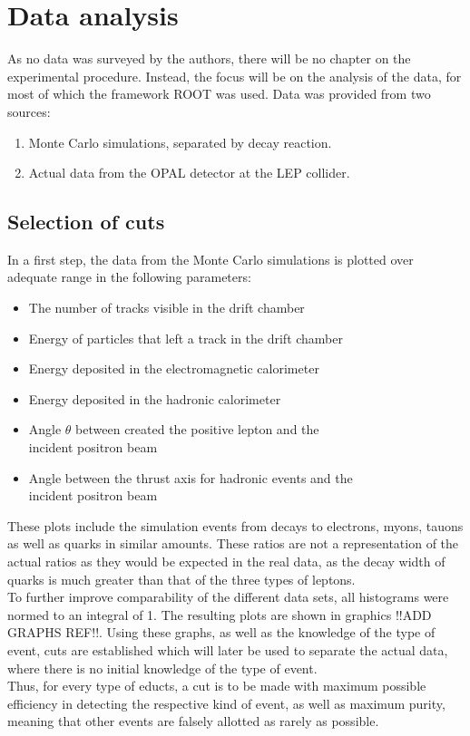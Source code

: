 \section{Data analysis}
As no data was surveyed by the authors, there will be no chapter on the experimental procedure. Instead, the focus will be on the analysis of the data, for most of which the framework ROOT was used. Data was provided from two sources:
\begin{enumerate}
	\item Monte Carlo simulations, separated by decay reaction.
	\item Actual data from the OPAL detector at the LEP collider.
\end{enumerate}


\subsection{Selection of cuts}
In a first step, the data from the Monte Carlo simulations is plotted over adequate range in the following parameters:
\begin{itemize}
	\item{ The number of tracks visible in the drift chamber}
	\item{ Energy of particles that left a track in the drift chamber}
	\item{ Energy deposited in the electromagnetic calorimeter}
	\item{ Energy deposited in the hadronic calorimeter}
	\item{ Angle $\theta$ between created the positive lepton and the \\incident positron beam}
	\item{ Angle between the thrust axis for hadronic events and the \\incident positron beam}
\end{itemize}
These plots include the simulation events from decays to electrons, myons, tauons as well as quarks in similar amounts. These ratios are not a representation of the actual ratios as they would be expected in the real data, as the decay width of quarks is much greater than that of the three types of leptons. \\
To further improve comparability of the different data sets, all histograms were normed to an integral of 1. The resulting plots are shown in graphics !!ADD GRAPHS REF!!. Using these graphs, as well as the knowledge of the type of event, cuts are established which will later be used to separate the actual data, where there is no initial knowledge of the type of event.\\
Thus, for every type of educts, a cut is to be made with maximum possible efficiency in detecting the respective kind of event, as well as maximum purity, meaning that other events are falsely allotted as rarely as possible.

